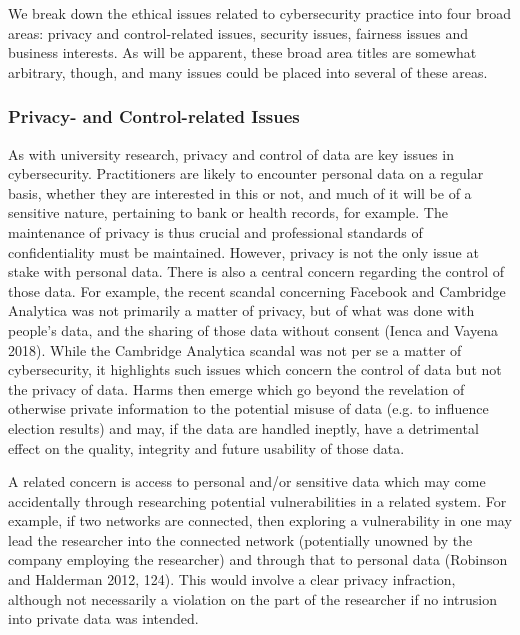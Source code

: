 \documentclass{svjour3}                     %
\begin{document}
We break down the ethical issues related to cybersecurity practice into four broad areas: privacy and control-related issues, security issues, fairness issues and business interests. As will be apparent, these broad area titles are somewhat arbitrary, though, and many issues could be placed into several of these areas.

\subsubsection{Privacy- and Control-related Issues}
As with university research, privacy and control of data are key issues in cybersecurity. Practitioners are likely to encounter personal data on a regular basis, whether they are interested in this or not, and much of it will be of a sensitive nature, pertaining to bank or health records, for example.  The maintenance of privacy is thus crucial and professional standards of confidentiality must be maintained. However, privacy is not the only issue at stake with personal data. There is also a central concern regarding the control of those data. For example, the recent scandal concerning Facebook and Cambridge Analytica was not primarily a matter of privacy, but of what was done with people’s data, and the sharing of those data without consent (Ienca and Vayena 2018). While the Cambridge Analytica scandal was not per se a matter of cybersecurity, it highlights such issues which concern the control of data but not the privacy of data. Harms then emerge which go beyond the revelation of otherwise private information to the potential misuse of data (e.g. to influence election results) and may, if the data are handled ineptly, have a detrimental effect on the quality, integrity and future usability of those data.

A related concern is access to personal and/or sensitive data which may come accidentally through researching potential vulnerabilities in a related system. For example, if two networks are connected, then exploring a vulnerability in one may lead the researcher into the connected network (potentially unowned by the company employing the researcher) and through that to personal data (Robinson and Halderman 2012, 124). This would involve a clear privacy infraction, although not necessarily a violation on the part of the researcher if no intrusion into private data was intended.
\end{document}
